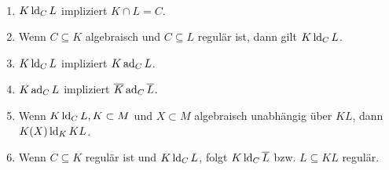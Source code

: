     \begin{lemma}\label{Rechenregeln}
    	\ 
    	\begin{enumerate}
    		\item $K\operatorname{ld}_CL$ impliziert $K\cap L=C$.
    		\item Wenn $C\subseteq K$ algebraisch und $C\subseteq L$ regulär ist, dann gilt $K\operatorname{ld}_CL$.
    		\item $K\operatorname{ld}_CL$ impliziert $K\operatorname{ad}_CL$.
    		\item $K\operatorname{ad}_CL$ impliziert $\overline{K}\operatorname{ad}_C\overline{L}$.
    		\item Wenn $K\operatorname{ld}_CL, K\subset M$ und $X\subset M$ algebraisch unabhängig über $KL$, dann $K(X)\operatorname{ld}_KKL$.
    		\item Wenn $C\subseteq K$ regulär ist und $K\operatorname{ld}_CL$, folgt $K\operatorname{ld}_C\overline{L}$ bzw. $L\subseteq KL$ regulär.
    	\end{enumerate}
    \end{lemma}

